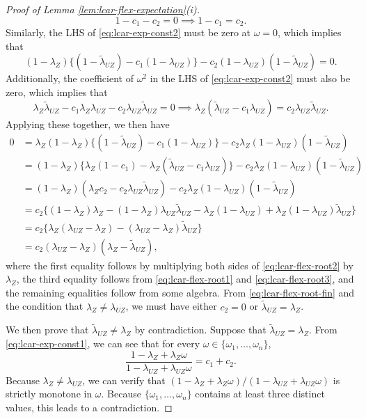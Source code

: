 \documentclass[11pt]{article}
\theoremstyle{definition}
\theoremstyle{remark}
\begin{document}
\begin{proof}[Proof of Lemma \ref{lem:lcar-flex-expectation}(i)]
\begin{equation}\label{eq:lcar-flex-root1}
1-c_1-c_2 =0 \implies 1-c_1=c_2.
\end{equation} Similarly, the LHS of \eqref{eq:lcar-exp-const2} must be zero at $\omega=0$, which implies that 
\begin{equation}\label{eq:lcar-flex-root2}
(1-\lambda_Z)\{(1-\tilde{\lambda}_{UZ}) - c_1(1-\lambda_{UZ})\} - c_2(1-\lambda_{UZ})(1-\tilde{\lambda}_{UZ}) =0.
\end{equation} 
Additionally, 
the coefficient of $\omega^2$ in the LHS of \eqref{eq:lcar-exp-const2} must also be zero, which implies that 
\begin{equation}\label{eq:lcar-flex-root3}
\lambda_Z\tilde{\lambda}_{UZ} - c_1 \lambda_Z \lambda_{UZ} - c_2\lambda_{UZ} \tilde\lambda_{UZ} =0 \implies \lambda_Z(\tilde{\lambda}_{UZ} - c_1\lambda_{UZ}) = c_2\lambda_{UZ} \tilde\lambda_{UZ}.
\end{equation}
Applying these together, 
we then have 
\begin{align}
0 &= \lambda_Z(1-\lambda_Z)\{(1-\tilde{\lambda}_{UZ}) - c_1(1-\lambda_{UZ})\} - c_2\lambda_Z(1-\lambda_{UZ})(1-\tilde{\lambda}_{UZ})\nonumber\\
&= (1-\lambda_Z)\{\lambda_Z(1-c_1) -\lambda_Z(\tilde\lambda_{UZ} - c_1\lambda_{UZ})\} - c_2\lambda_Z(1-\lambda_{UZ})(1-\tilde{\lambda}_{UZ})\nonumber\\
&=(1-\lambda_Z)(\lambda_Zc_2 - c_2\lambda_{UZ}
\tilde{\lambda}_{UZ}) - c_2\lambda_Z(1-\lambda_{UZ})(1-\tilde\lambda_{UZ}) \nonumber\\
&= c_2 \{(1-\lambda_Z)\lambda_Z - (1-\lambda_Z)\lambda_{UZ}\tilde\lambda_{UZ} - \lambda_Z(1-\lambda_{UZ}) + \lambda_Z(1-\lambda_{UZ})\tilde\lambda_{UZ}\} \nonumber\\
&= c_2\{\lambda_Z(\lambda_{UZ}-\lambda_Z) - (\lambda_{UZ} - \lambda_Z)\tilde{\lambda}_{UZ}\} \nonumber\\
&= c_2(\lambda_{UZ} - \lambda_Z)(\lambda_Z - \tilde{\lambda}_{UZ}), \label{eq:lcar-flex-root-fin}
\end{align} 
where the first equality follows by multiplying both sides of \eqref{eq:lcar-flex-root2} by $\lambda_Z$, 
the third equality follows from \eqref{eq:lcar-flex-root1} and \eqref{eq:lcar-flex-root3}, and the remaining equalities follow from some algebra. 
From \eqref{eq:lcar-flex-root-fin} and the condition that $\lambda_Z \neq \lambda_{UZ}$, we must have either $c_2=0$ or $\tilde\lambda_{UZ} = \lambda_Z$. 

We then prove that $\tilde\lambda_{UZ}\ne \lambda_Z$ by contradiction. 
Suppose that $\tilde\lambda_{UZ} = \lambda_Z$. From \eqref{eq:lcar-exp-const1}, we can see that for every $\omega \in \{\omega_1,\ldots,\omega_n\}$, 
\[\frac{1-\lambda_Z+\lambda_Z\omega}{1-\lambda_{UZ} + \lambda_{UZ} \omega} = c_1+c_2.\]
Because $\lambda_Z \neq \lambda_{UZ}$, we can verify that $(1-\lambda_Z+\lambda_Z\omega)/(1-\lambda_{UZ} + \lambda_{UZ} \omega)$ is strictly monotone in $\omega$. Because $\{\omega_1,\ldots,\omega_n\}$ contains at least three distinct values, this leads to a contradiction. 



\end{proof}
\end{document}
